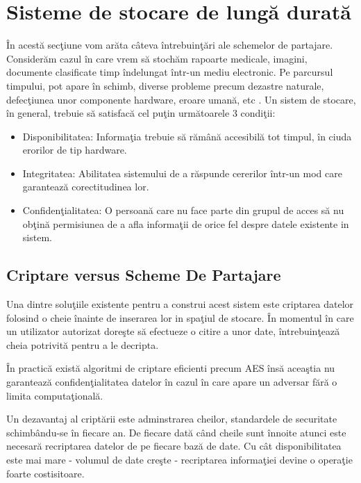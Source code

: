 \documentclass{llncs}
\begin{document}
\section{Sisteme de stocare de lung\u{a} durat\u{a}}
\label{sec:long_term_systems_intro}
\^{I}n acest\u{a} sec\c{t}iune vom ar\u{a}ta c\^{a}teva \^{i}ntrebuin\c{t}\u{a}ri ale schemelor de partajare. Consider\u{a}m cazul \^{i}n care vrem s\u{a} stoch\u{a}m rapoarte medicale, imagini, documente clasificate timp \^{i}ndelungat \^{i}ntr-un mediu electronic. Pe parcursul timpului, pot apare \^{i}n schimb, diverse probleme precum dezastre naturale, defec\c{t}iunea unor componente hardware, eroare uman\u{a}, etc \cite{SGMV:2009}.
Un sistem de stocare, \^{i}n general, trebuie s\u{a} satisfac\u{a} cel pu\c{t}in urm\u{a}toarele 3 condi\c{t}ii:
\begin{itemize}
	\item Disponibilitatea: Informa\c{t}ia trebuie s\u{a} r\u{a}m\^{a}n\u{a} accesibil\u{a} tot timpul, \^{i}n ciuda erorilor de tip hardware.
	\item Integritatea: Abilitatea sistemului de a r\u{a}spunde cererilor \^{i}ntr-un mod care garanteaz\u{a} corectitudinea lor.
	\item Confiden\c{t}ialitatea: O persoan\u{a} care nu face parte din grupul de acces s\u{a} nu ob\c{t}in\u{a} permisiunea de a afla informa\c{t}ii de orice fel despre datele existente in sistem.
\end{itemize}

\subsection{Criptare versus Scheme De Partajare}

Una dintre solu\c{t}iile existente pentru a construi acest sistem este criptarea datelor folosind o cheie \^{i}nainte de inserarea lor in spa\c{t}iul de stocare. \^{I}n momentul \^{i}n care un utilizator autorizat dore\c{s}te s\u{a} efectueze o citire a unor date, \^{i}ntrebuin\c{t}eaz\u{a} cheia potrivit\u{a} pentru a le decripta.

\^{I}n practic\u{a} exist\u{a} algoritmi de criptare eficienti precum AES \^{i}ns\u{a} acea\c{s}tia nu garanteaz\u{a} confiden\c{t}ialitatea datelor \^{i}n cazul \^{i}n care apare un adversar f\u{a}r\u{a} o limita computa\c{t}ional\u{a}.

Un dezavantaj al cript\u{a}rii este adminstrarea cheilor, standardele de securitate schimb\^{a}ndu-se \^{i}n fiecare an.
De fiecare dat\u{a} c\^{a}nd cheile sunt \^{i}nnoite atunci este necesar\u{a} recriptarea datelor de pe fiecare baz\u{a} de date. Cu c\^{a}t disponibilitatea este mai mare - volumul de date cre\c{s}te - recriptarea informa\c{t}iei devine o opera\c{t}ie foarte costisitoare. 
\end{document}

